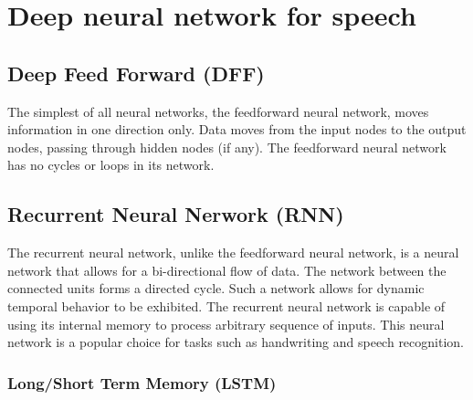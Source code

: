 \section{Deep neural network for speech}
\subsection{Deep Feed Forward (DFF)}
The simplest of all neural networks, the feedforward neural network, moves information in one direction only.
Data moves from the input nodes to the output nodes,
passing through hidden nodes (if any).
The feedforward neural network has no cycles or loops in its network.

\subsection{Recurrent Neural Nerwork (RNN)}
The recurrent neural network, unlike the feedforward neural network, is a neural network that allows for a bi-directional flow of data. 
The network between the connected units forms a directed cycle.
Such a network allows for dynamic temporal behavior to be exhibited.
The recurrent neural network is capable of using its internal memory to process arbitrary sequence of inputs.
This neural network is a popular choice for tasks such as handwriting and speech recognition.

\subsubsection{Long/Short Term Memory (LSTM)}
